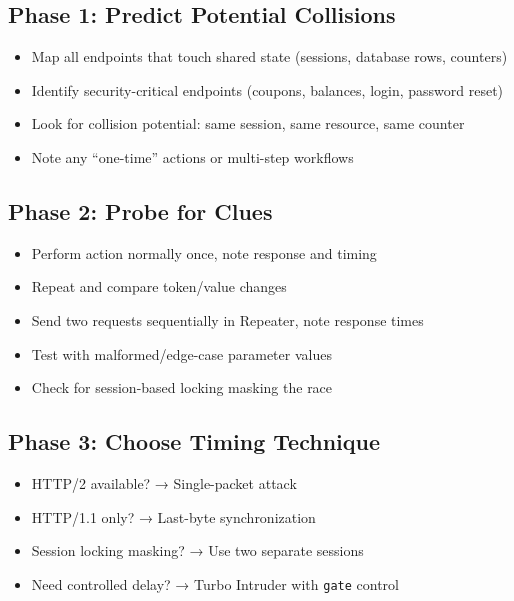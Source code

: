 \documentclass[11pt]{article}
\begin{document}
\begin{checklistbox}
\subsection*{Phase 1: Predict Potential Collisions}
\begin{itemize}
    \item[$\square$] Map all endpoints that touch shared state (sessions, database rows, counters)
    \item[$\square$] Identify security-critical endpoints (coupons, balances, login, password reset)
    \item[$\square$] Look for collision potential: same session, same resource, same counter
    \item[$\square$] Note any ``one-time'' actions or multi-step workflows
\end{itemize}

\subsection*{Phase 2: Probe for Clues}
\begin{itemize}
    \item[$\square$] Perform action normally once, note response and timing
    \item[$\square$] Repeat and compare token/value changes
    \item[$\square$] Send two requests sequentially in Repeater, note response times
    \item[$\square$] Test with malformed/edge-case parameter values
    \item[$\square$] Check for session-based locking masking the race
\end{itemize}

\subsection*{Phase 3: Choose Timing Technique}
\begin{itemize}
    \item[$\square$] HTTP/2 available? → Single-packet attack
    \item[$\square$] HTTP/1.1 only? → Last-byte synchronization
    \item[$\square$] Session locking masking? → Use two separate sessions
    \item[$\square$] Need controlled delay? → Turbo Intruder with \texttt{gate} control
\end{itemize}


\end{checklistbox}
\end{document}
